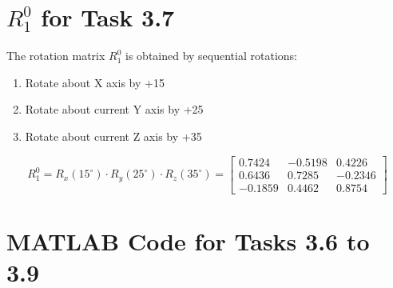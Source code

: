 \documentclass[11pt,a4paper]{article}
\begin{document}
\section{$R_1^0$ for Task 3.7}

The rotation matrix $R_1^0$ is obtained by sequential rotations:
\begin{enumerate}
    \item Rotate about X axis by +15\textdegree
    \item Rotate about current Y axis by +25\textdegree  
    \item Rotate about current Z axis by +35\textdegree
\end{enumerate}

$$R_1^0 = R_x(15^\circ) \cdot R_y(25^\circ) \cdot R_z(35^\circ) = \begin{bmatrix}
0.7424 & -0.5198 & 0.4226 \\
0.6436 & 0.7285 & -0.2346 \\
-0.1859 & 0.4462 & 0.8754
\end{bmatrix}$$

\section{MATLAB Code for Tasks 3.6 to 3.9}
\end{document}
